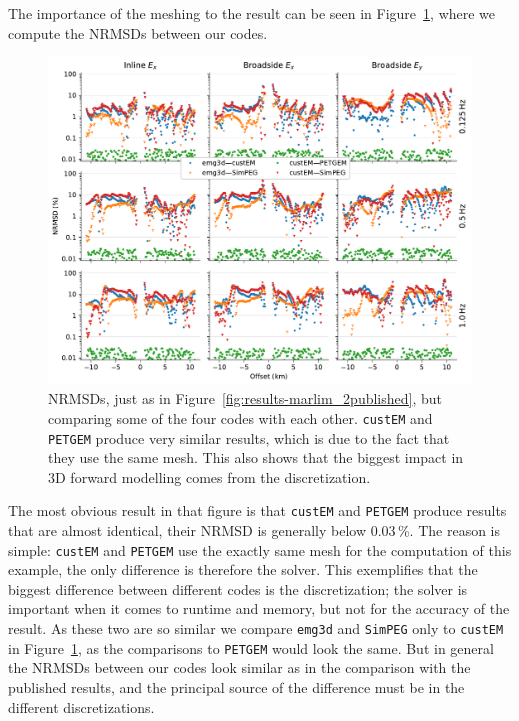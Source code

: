 \documentclass[onecolumn,extra,camera]{gji}
\newcommand{\emg}[2]{\texttt{emg#1#2}\xspace}
\newcommand{\simpeg}{\texttt{SimPEG}\xspace}
\newcommand{\custem}{\texttt{custEM}\xspace}
\newcommand{\petgem}{\texttt{PETGEM}\xspace}
\begin{document}
The importance of the meshing to the result can be seen in Figure~\ref{fig:results-marlim_2ours}, where we compute the NRMSDs between our codes.
%
\begin{figure}
  \centering
  \includegraphics[width=.9\linewidth]{figures/results-marlim_2ours}
  \caption{NRMSDs, just as in Figure~\ref{fig:results-marlim_2published}, but comparing some of the four codes with each other. \custem and \petgem produce very similar results, which is due to the fact that they use the same mesh. This also shows that the biggest impact in 3D forward modelling comes from the discretization.}
  \label{fig:results-marlim_2ours}
\end{figure}
%
The most obvious result in that figure is that \custem and \petgem produce results that are almost identical, their NRMSD is generally below 0.03\,\%. The reason is simple: \custem and \petgem use the exactly same mesh for the computation of this example, the only difference is therefore the solver. This exemplifies that the biggest difference between different codes is the discretization; the solver is important when it comes to runtime and memory, but not for the accuracy of the result. As these two are so similar we compare \emg3d and \simpeg only to \custem in Figure~\ref{fig:results-marlim_2ours}, as the comparisons to \petgem would look the same. But in general the NRMSDs between our codes look similar as in the comparison with the published results, and the principal source of the difference must be in the different discretizations.
\end{document}
